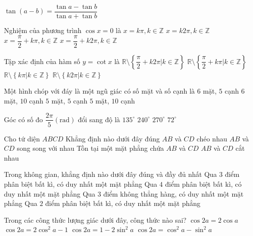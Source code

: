 \documentclass[11pt,a4paper,oneside]{article}
\begin{document}
\begin{multicols}{2}
\begin{ex}
	{$\tan(a - b) = \dfrac{\tan a - \tan b}{\tan a + \tan b}$} %
	\loigiai{
	}
	\end{ex}
	\begin{ex}
	Nghiệm của phương trình $\cos x = 0$ là
	\choice
	{$x = k\pi, k \in \mathbb{Z}$}
	{$x = k2\pi, k \in \mathbb{Z}$}
	{$x = \dfrac{\pi}{2} + k\pi, k \in \mathbb{Z}$}
	{$x = \dfrac{\pi}{2} + k2\pi, k \in \mathbb{Z}$}
	\loigiai{
	}
	\end{ex}
	\begin{ex}
	Tập xác định của hàm số $y = \cot x$ là
	\choice
	{$\mathbb{R} \setminus \left\{ \dfrac{\pi}{2} + k2\pi \Big| k \in \mathbb{Z} \right\}$}
	{$\mathbb{R} \setminus \left\{ \dfrac{\pi}{2} + k\pi \Big| k \in \mathbb{Z} \right\}$}
	{$\mathbb{R} \setminus \left\{ k\pi \Big| k \in \mathbb{Z} \right\}$}
	{$\mathbb{R} \setminus \left\{ k2\pi \Big| k \in \mathbb{Z} \right\}$}
	\loigiai{
	}
	\end{ex}
	\begin{ex}
	Một hình chóp với đáy là một ngũ giác có số mặt và số cạnh là
	\choice
	{$6$ mặt, $5$ cạnh}
	{$6$ mặt, $10$ cạnh}
	{$5$ mặt, $5$ cạnh}
	{$5$ mặt, $10$ cạnh}
	\loigiai{
	}
	\end{ex}
	\begin{ex}
	Góc có số đo $\dfrac{2\pi}{5} (\text{rad})$ đổi sang độ là
	\choice
	{$135^\circ$}
	{$240^\circ$}
	{$270^\circ$}
	{$72^\circ$}
	\loigiai{
	}
	\end{ex}
	\begin{ex}
	Cho tứ diện $ABCD$ Khẳng định nào dưới đây đúng
	\choice
	{$AB$ và $CD$ chéo nhau}
	{$AB$ và $CD$ song song với nhau}
	{Tồn tại một mặt phẳng chứa $AB$ và $CD$}
	{$AB$ và $CD$ cắt nhau}
	\loigiai{
	}
	\end{ex}
	\begin{ex}
	Trong không gian, khẳng định nào dưới đây đúng và đầy đủ nhất
	\choice
	{Qua $3$ điểm phân biệt bất kì, có duy nhất một mặt phẳng}
	{Qua $4$ điểm phân biệt bất kì, có duy nhất một mặt phẳng}
	{Qua $3$ điểm không thẳng hàng, có duy nhất một mặt phẳng}
	{Qua $2$ điểm phân biệt bất kì, có duy nhất một mặt phẳng}
	\loigiai{
	}
	\end{ex}
	\begin{ex}
	Trong các công thức lượng giác dưới đây, công thức nào sai?
	\choice
	{$\cos 2a = 2 \cos a$}
	{$\cos 2a = 2 \cos^2 a - 1$}
	{$\cos 2a = 1 - 2 \sin^2 a$}
	{$\cos 2a = \cos^2 a - \sin^2 a$}

\end{ex}
\end{multicols}
\end{document}
